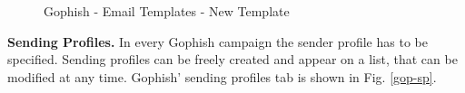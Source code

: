\documentclass[a4paper]{article}
\begin{document}
\begin{figure}[H]
	\centering
	\caption{Gophish - Email Templates - New Template}
	\label{gop-tnt}
\end{figure}

\noindent
\textbf{Sending Profiles.} In every Gophish campaign the sender profile has to be specified. Sending profiles can be freely created and appear on a list, that can be modified at any time. Gophish' sending profiles tab is shown in Fig. \ref{gop-sp}.
\end{document}
